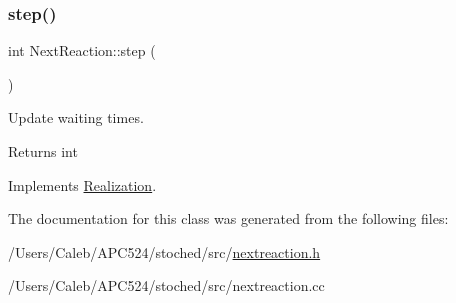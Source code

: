 \subsubsection{\texorpdfstring{step()}{step()}}
{\footnotesize\ttfamily int Next\+Reaction\+::step (\begin{DoxyParamCaption}{ }\end{DoxyParamCaption})\hspace{0.3cm}{\ttfamily [virtual]}}



Update waiting times. 

\begin{DoxyReturn}{Returns}
int 
\end{DoxyReturn}


Implements \hyperlink{class_realization}{Realization}.



The documentation for this class was generated from the following files\+:\begin{DoxyCompactItemize}
\item 
/\+Users/\+Caleb/\+A\+P\+C524/stoched/src/\hyperlink{nextreaction_8h}{nextreaction.\+h}\item 
/\+Users/\+Caleb/\+A\+P\+C524/stoched/src/nextreaction.\+cc\end{DoxyCompactItemize}
